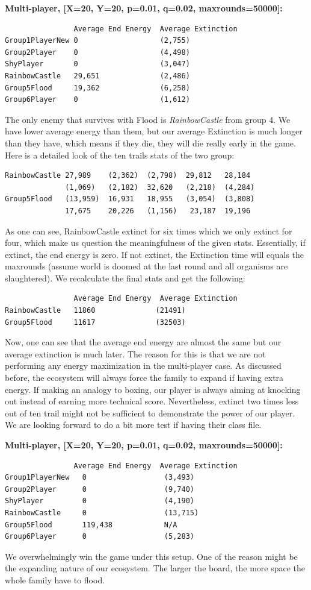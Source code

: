 \textbf{Multi-player, [X=20, Y=20, p=0.01, q=0.02, maxrounds=50000]:}
\begin{verbatim}
                Average End Energy	Average Extinction
Group1PlayerNew 0                   (2,755)
Group2Player    0                   (4,498)
ShyPlayer       0                   (3,047)
RainbowCastle   29,651              (2,486)
Group5Flood     19,362              (6,258)
Group6Player    0                   (1,612)
\end{verbatim}
The only enemy that survives with Flood is \textit{RainbowCastle} from group 4.
We have lower average energy than them, but our average Extinction is much longer than
they have, which means if they die, they will die really early in the game.
Here is a detailed look of the ten trails stats of the two group:
\begin{verbatim}
RainbowCastle 27,989    (2,362)  (2,798)  29,812   28,184   
              (1,069)   (2,182)  32,620   (2,218)  (4,284) 
Group5Flood   (13,959)  16,931   18,955   (3,054)  (3,808)
              17,675    20,226   (1,156)   23,187  19,196 
\end{verbatim}
As one can see, RainbowCastle extinct for six times which we only extinct for four, 
which make us question the meaningfulness of the given stats.
Essentially, if extinct, the end energy is zero.
If not extinct, the Extinction time will equals the maxrounds
(assume world is doomed at the last round and all organisms are slaughtered).
We recalculate the final stats and get the following:
\begin{verbatim}
                Average End Energy	Average Extinction
RainbowCastle   11860              (21491)
Group5Flood     11617              (32503)
\end{verbatim}
Now, one can see that the average end energy are almost the same but our average extinction 
is much later.
The reason for this is that we are not performing any energy maximization in the multi-player case. As discussed before, the ecosystem will always force the family to expand if having extra energy.
If making an analogy to boxing, our player is always aiming at knocking out instead of earning more technical score.
Nevertheless, extinct two times less out of ten trail might not be sufficient to demonstrate the power of our player. 
We are looking forward to do a bit more test if having their class file.

\textbf{Multi-player, [X=20, Y=20, p=0.01, q=0.02, maxrounds=50000]:}
\begin{verbatim}
                Average End Energy	Average Extinction
Group1PlayerNew   0                  (3,493)
Group2Player      0                  (9,740)
ShyPlayer         0                  (4,190)
RainbowCastle     0                  (13,715)
Group5Flood       119,438            N/A
Group6Player      0                  (5,283)
\end{verbatim}
We overwhelmingly win the game under this setup.
One of the reason might be the expanding nature of our ecosystem.
The larger the board, the more space the whole family have to flood.

